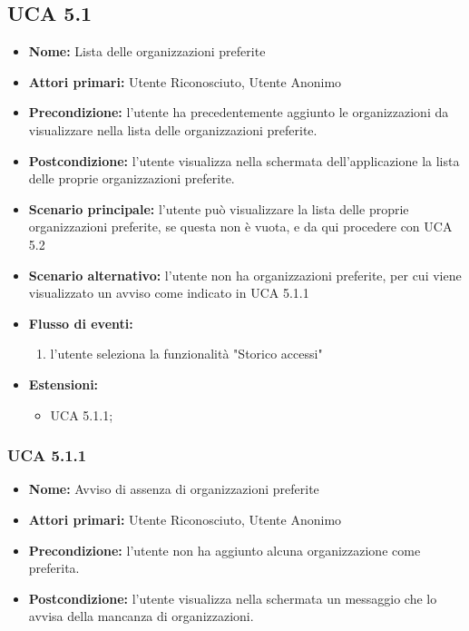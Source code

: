 \subsection{UCA 5.1}
\begin{itemize}
    \item \textbf{Nome:} Lista delle organizzazioni preferite
    \item \textbf{Attori primari:} Utente Riconosciuto, Utente Anonimo
    \item \textbf{Precondizione:} l’utente ha precedentemente aggiunto le organizzazioni da visualizzare nella lista delle organizzazioni preferite.
    \item \textbf{Postcondizione:} l’utente visualizza nella schermata dell’applicazione la lista delle proprie organizzazioni preferite. 
    \item \textbf{Scenario principale:} l'utente può visualizzare la lista delle proprie organizzazioni preferite, se questa non è vuota, e da qui procedere con UCA 5.2
    \item \textbf{Scenario alternativo:} l'utente non ha organizzazioni preferite, per cui viene visualizzato un avviso come indicato in UCA 5.1.1
    \item \textbf{Flusso di eventi:}
    \begin{enumerate}
        \item l'utente seleziona la funzionalità "Storico accessi"
    \end{enumerate}
    \item \textbf{Estensioni:}
    \begin{itemize}
        \item UCA 5.1.1;
    \end{itemize}
\end{itemize}

\subsubsection{UCA 5.1.1}
\begin{itemize}
    \item \textbf{Nome:} Avviso di assenza di organizzazioni preferite
    \item \textbf{Attori primari:} Utente Riconosciuto, Utente Anonimo
    \item \textbf{Precondizione:} l'utente non ha aggiunto alcuna organizzazione come preferita.
    \item \textbf{Postcondizione:} l'utente visualizza nella schermata un messaggio che lo avvisa della mancanza di organizzazioni.
\end{itemize}

